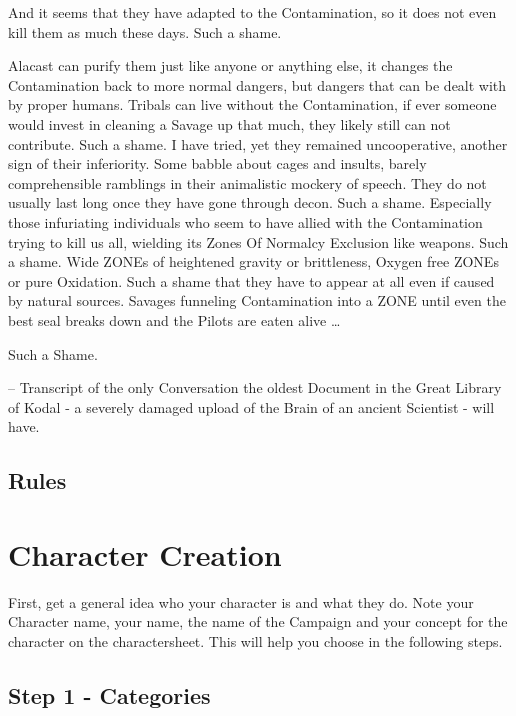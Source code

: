 \documentclass[a4paper]{book}
\begin{document}
    And it seems that they have adapted to the Contamination, so it does not even kill them as much these days.
    Such a shame. \par
    Alacast can purify them just like anyone or anything else,
    it changes the Contamination back to more normal dangers, but dangers that can be dealt with by proper humans.
    Tribals can live without the Contamination,
    if ever someone would invest in cleaning a Savage up that much, they likely still can not contribute.
    Such a shame.
    I have tried, yet they remained uncooperative, another sign of their inferiority.
    Some babble about cages and insults, barely comprehensible ramblings in their animalistic mockery of
    speech.
    They do not usually last long once they have gone through decon.
    Such a shame.
    Especially those infuriating individuals who seem to have allied with the Contamination trying to kill us all,
    wielding its Zones Of Normalcy Exclusion like weapons.
    Such a shame.
    Wide ZONEs of heightened gravity or brittleness, Oxygen free ZONEs or pure Oxidation.
    Such a shame that they have to appear at all even if caused by natural sources.
    Savages funneling Contamination into a ZONE  until even the best seal breaks down and the Pilots are eaten alive
    \ldots \par Such a Shame. \par \par
    -- Transcript of the only Conversation the oldest Document in the Great Library of Kodal - a severely damaged
    upload of the Brain of an ancient Scientist - will have.\newpage


    \section{Rules}\label{sec:rules}
    


    \chapter{Character Creation}\label{ch:charactercreation}
    First, get a general idea who your character is and what they do.
    Note your Character name, your name, the name of the
    Campaign and your concept for the character on the charactersheet.
    This will help you choose in the following steps.

    \section{Step 1 - Categories}\label{sec:step1-categories}
\end{document}
